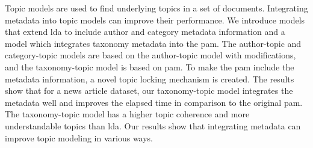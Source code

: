 Topic models are used to find underlying topics in a set of documents.
Integrating metadata into topic models can improve their performance.
We introduce models that extend \gls{lda} to include author and category metadata information and a model which integrates taxonomy metadata into the \gls{pam}.
The author-topic and category-topic models are based on the author-topic model with modifications, and the taxonomy-topic model is based on \gls{pam}.
To make the \gls{pam} include the metadata information, a novel topic locking mechanism is created.
The results show that for a news article dataset, our taxonomy-topic model integrates the metadata well and improves the elapsed time in comparison to the original \gls{pam}.
The taxonomy-topic model has a higher topic coherence and more understandable topics than \gls{lda}.
Our results show that integrating metadata can improve topic modeling in various ways.
